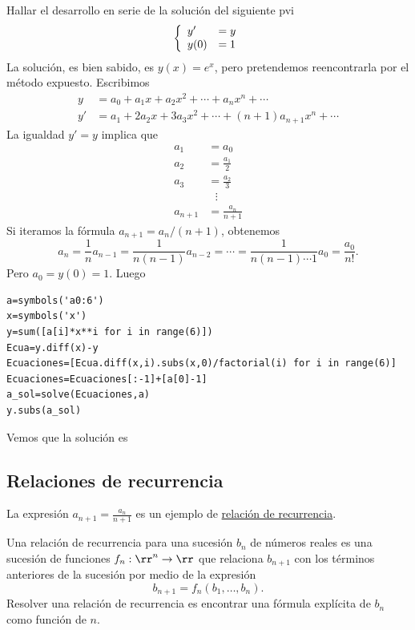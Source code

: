 \begin{ejemplo}{} Hallar el desarrollo en serie de la solución del siguiente pvi
\[\left\{\begin{array}{l l} y'&=y\\ y(0)&=1\end{array}\right.\]
La solución, es bien sabido, es $y(x)=e^x$,  pero pretendemos reencontrarla por el método expuesto. Escribimos
\[\begin{split}
   y&=a_0+a_1x+a_2x^2+\cdots+a_nx^n+\cdots\\
   y'&=a_1+2a_2x+3a_3x^2+\cdots+(n+1)a_{n+1}x^n+\cdots
  \end{split}
\]
La igualdad $y'=y$ implica que
\[\begin{split}
   a_1&=a_0\\
   a_2&=\frac{a_1}{2}\\
   a_3&=\frac{a_2}{3}\\
      &\,\,\,\,\vdots \\
   a_{n+1}&=\frac{a_{n}}{n+1}
 \end{split}
\]
Si iteramos la fórmula $a_{n+1}=a_{n}/(n+1)$, obtenemos
\[a_n=\frac{1}{n}a_{n-1}=\frac{1}{n(n-1)}a_{n-2}=\cdots=\frac{1}{n(n-1)\cdots 1}a_{0}=\frac{a_0}{n!}.\]
Pero $a_0=y(0)=1$. Luego




\begin{lstlisting}
a=symbols('a0:6')
x=symbols('x')
y=sum([a[i]*x**i for i in range(6)])
Ecua=y.diff(x)-y
Ecuaciones=[Ecua.diff(x,i).subs(x,0)/factorial(i) for i in range(6)]
Ecuaciones=Ecuaciones[:-1]+[a[0]-1]
a_sol=solve(Ecuaciones,a)
y.subs(a_sol)
\end{lstlisting}


Vemos que la solución es
\end{ejemplo}






\subsection{Relaciones de recurrencia}

La expresión $a_{n+1}=\frac{a_{n}}{n+1}$ es un ejemplo de \href{http://es.wikipedia.org/wiki/Relación_de_recurrencia}{relación de recurrencia}.
\begin{definicion}{} Una  relación de recurrencia para una sucesión $b_n$ de números reales es una sucesión de
funciones $f_n:\rr^n\to\rr$ que relaciona $b_{n+1}$ con los términos anteriores de la sucesión por medio de
la expresión
\begin{equation}\label{eq:recu} b_{n+1}=f_n(b_1,\ldots,b_n).
\end{equation}
Resolver una relación de recurrencia es encontrar una fórmula explícita de $b_n$ como función de $n$.
 \end{definicion}



